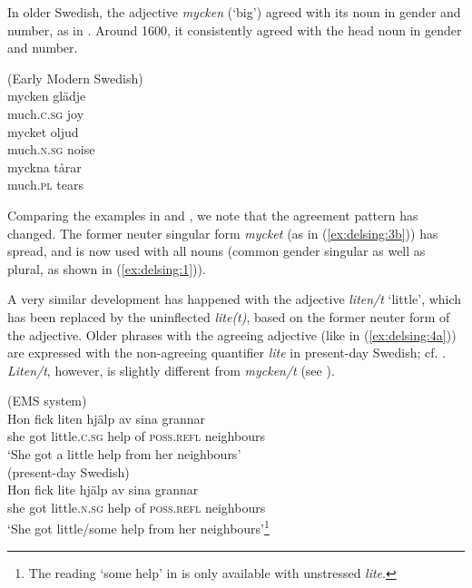 \documentclass[output=paper]{langscibook}
\begin{document}
In older Swedish, the adjective \textit{mycken} (‘big’) agreed with its noun in gender and number, as in . Around 1600, it consistently agreed with the head noun in gender and number.


\ea(Early Modern Swedish)\\\label{ex:delsing:3}
\ea\label{ex:delsing:3a}
\gll mycken      glädje\\
much\textsc{.c.sg}    joy \\
\ex\label{ex:delsing:3b}
\gll mycket          oljud\\
    much\textsc{.n.sg}    noise \\
\ex\label{ex:delsing:3c}
\gll myckna      tårar \\
    much\textsc{.pl}  tears \\
\z
\z

Comparing the examples in  and , we note that the agreement pattern has changed. The former neuter singular form \textit{mycket} (as in (\ref{ex:delsing:3b})) has spread, and is now used with all nouns (common gender singular as well as plural, as shown in (\ref{ex:delsing:1})).



A very similar development has happened with the adjective \textit{liten/t} ‘little’, which has been replaced by the uninflected \textit{lite(t)}, based on the former neuter form of the adjective. Older phrases with the agreeing adjective (like in (\ref{ex:delsing:4a})) are expressed with the non-agreeing quantifier \textit{lite} in present-day Swedish; cf. . \textit{Liten/t}, however, is  slightly different from \textit{mycken/t} (see ).


\ea\label{ex:delsing:4}
\ea\label{ex:delsing:4a}(EMS system)\\
\gll Hon  fick    liten        hjälp  av  sina          grannar\\
she      got  little.\textsc{c.sg}    help  of    \textsc{poss.refl}    neighbours\\
     \glt ‘She got a little help from her neighbours’\\

\ex\label{ex:delsing:4b}(present-day Swedish)\\
\gll Hon    fick    lite        hjälp    av  sina        grannar    \\
      she      got    little.\textsc{n.sg}  help    of  \textsc{poss.refl}  neighbours\\
      \glt ‘She got little/some help from her neighbours’\footnote{The reading ‘some help’ in  is only available with unstressed \textit{lite}.}\\
\z
\z
\end{document}
